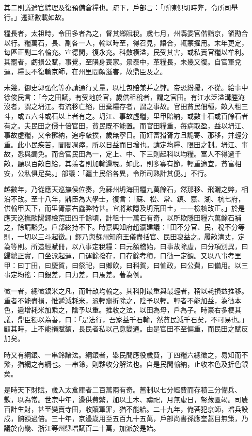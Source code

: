 其二則議遣官綜理及復預備倉糧也。疏下，戶部言：「所陳俱切時弊，令所司舉行。」遷延數載如故。

糧長者，太祖時，令田多者為之，督其鄉賦稅。歲七月，州縣委官偕詣京，領勘合以行。糧萬石，長、副各一人，輸以時至，得召見，語合，輒蒙擢用。末年更定，每區正副二名輪充。宣德間，復永充。科斂橫溢，民受其害，或私賣官糧以牟利。其罷者，虧損公賦，事覺，至隕身喪家。景泰中，革糧長，未幾又復。自官軍兌運，糧長不復輸京師，在州里間頗滋害，故鼎臣及之。

未幾，御史郭弘化等亦請通行丈量，以杜包賠兼并之弊。帝恐紛擾，不從。給事中徐俊民言：「今之田賦，有受地於官，歲供租稅者，謂之官田。有江水泛溢溝塍淹沒者，謂之坍江。有流移亡絕，田棄糧存者，謂之事故。官田貧民佃種，畝入租三斗，或五六斗或石以上者有之。坍江、事故虛糧，里甲賠納，或數十石或百餘石者有之。夫民田之價十倍官田，貧民既不能置。而官田糧重，每病取盈，益以坍江、事故虛糧，又令攤納，追呼敲撲，歲無寧日。而奸富猾胥方且詭寄、那移，并輕分重。此小民疾苦，閭閻凋瘁，所以日益而日增也。請定均糧、限田之制。坍江、事故，悉與蠲免。而合官民田為一，定上、中、下三則起科以均糧。富人不得過千畝，聽以百畝自給，其羨者則加輸邊稅。如此，則多寡有節，輕重適宜，貧富相安，公私俱足矣。」部議：「疆土民俗各異，令所司熟計其便。」不行。

越數年，乃從應天巡撫侯位奏，免蘇州坍海田糧九萬餘石，然那移、飛灑之弊，相沿不改。至十八年，鼎臣為大學士，復言：「蘇、松、常、鎮、嘉、湖、杭七府，供輸甲天下，而里胥豪右蠹弊特甚。宜將欺隱及坍荒田土，一一檢核改正。」於是應天巡撫歐陽鐸檢荒田四千餘頃，計租十一萬石有奇，以所欺隱田糧六萬餘石補之，餘請豁免。戶部終持不下。時嘉興知府趙瀛建議：「田不分官、民，稅不分等則，一切以三斗起徵。」鐸乃與蘇州知府王儀盡括官、民田裒益之。履畝清丈，定為等則。所造經賦冊，以八事定稅糧：曰元額稽始，曰事故除虛，曰分項別異，曰歸總正實，曰坐派起運，曰運餘撥存，曰存餘考積，曰徵一定額。又以八事考里甲：曰丁田，曰慶賀，曰祭祀，曰鄉飲，曰科賀，曰恤政，曰公費，曰備用。以三事定均徭：曰銀差，曰力差，曰馬差。著為例。

徵一者，總徵銀米之凡，而計畝均輸之。其科則最重與最輕者，稍以耗損益推移。重者不能盡損，惟遞減耗米，派輕齎折除之，陰予以輕。輕者不能加益，為徵本色，遞增耗米加乘之，陰予以重。推收之法，以田為母，戶為子。時豪右多梗其議，鼎臣獨以為善，曰：「是法行，吾家益千石輸，然貧民減千石矣，不可易也。」顧其時，上不能損賦額，長民者私以己意變通。由是官田不至偏重，而民田之賦反加矣。

時又有綱銀、一串鈴諸法。綱銀者，舉民間應役歲費，丁四糧六總徵之，易知而不繁，猶網之有綱也。一串鈴，則夥收分解法也。自是民間輸納，止收本色及折色銀矣。

是時天下財賦，歲入太倉庫者二百萬兩有奇。舊制以七分經費而存積三分備兵、歉，以為常。世宗中年，邊供費繁，加以土木、禱祀，月無虛日，帑藏匱竭。司農百計生財，甚至變賣寺田，收贖軍罪，猶不能給。二十九年，俺荅犯京師，增兵設戍，餉額過倍。三十年，京邊歲用至五百九十五萬，戶部尚書孫應奎蒿目無策，乃議於南畿、浙江等州縣增賦百二十萬，加派於是始。

